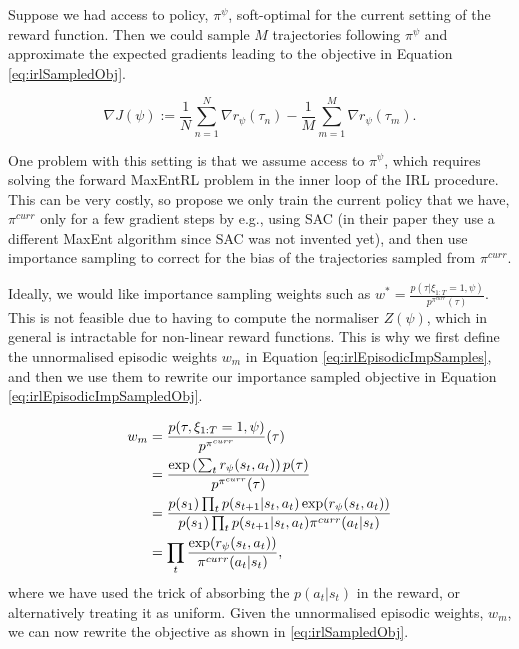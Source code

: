 \documentclass{report}
\numberwithin{equation}{section}
\numberwithin{figure}{section}
\numberwithin{table}{section}
\numberwithin{algorithm}{section}
\begin{document}
Suppose we had access to policy, $\pi^\psi$, soft-optimal for the 
current setting of the reward function.
Then we could sample $M$ trajectories following $\pi^\psi$ 
and approximate the expected gradients leading to the 
objective in Equation \ref{eq:irlSampledObj}.

\begin{equation}\label{eq:irlSampledObj}
  \nabla J(\psi):=\frac{1}{N} \sum_{n=1}^N \nabla r_\psi(\tau_n)
  - \frac{1}{M}\sum_{m=1}^M \nabla r_\psi(\tau_m).
\end{equation}

One problem with this setting is that we assume access to $\pi^\psi$, 
which requires solving the forward MaxEntRL problem in the 
inner loop of the IRL procedure. This can be very costly, so 
\cite{FinnGCL} propose we only train the current policy that 
we have, $\pi^{curr}$ only for a few gradient steps by e.g., 
using SAC (in their paper they use a different MaxEnt algorithm 
since SAC was not invented yet), and then use importance sampling 
to correct for the bias of the trajectories sampled from $\pi^{curr}$.

Ideally, we would like importance sampling weights such as 
$w^*=\frac{p(\tau|\xi_{1:T}=1,\psi)}{p^{\pi^{curr}}(\tau)}$. 
This is not feasible due to having to compute the normaliser 
$Z(\psi)$, which in general is intractable for non-linear reward 
functions. This is why we first 
define the unnormalised episodic weights $w_m$ 
in Equation \ref{eq:irlEpisodicImpSamples}, and then 
we use them to rewrite our importance sampled objective 
in Equation \ref{eq:irlEpisodicImpSampledObj}.

\begin{align}\label{eq:irlEpisodicImpSamples}
  w_m&=\frac{p(\tau,\xi_{1:T}=1,\psi)}{p^{\pi^{curr}}}(\tau)\notag\\
  &=\frac{\exp\left(
      \sum_t r_\psi(s_t,a_t)
    \right)p(\tau)
  }{
    p^{\pi^{curr}}(\tau)
  }\notag\\
  &=\frac{
    p(s_1)\prod_t p(s_{t+1}|s_t,a_t)\exp(r_\psi(s_t,a_t))
  }{
    p(s_1)\prod_t p(s_{t+1}|s_t,a_t)\pi^{curr}(a_t|s_t)
  }\notag\\
  &=\prod_t\frac{\exp(r_\psi(s_t,a_t))}{\pi^{curr}(a_t|s_t)},
\end{align}
where we have used the trick of absorbing the $p(a_t|s_t)$ in 
the reward, or alternatively treating it as uniform.
Given the unnormalised episodic weights, $w_m$, we can now 
rewrite the objective as shown in \ref{eq:irlSampledObj}.
\end{document}
